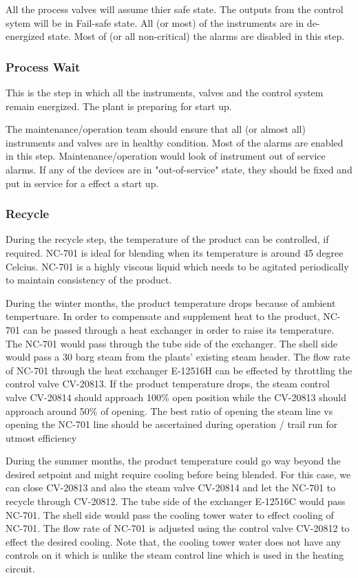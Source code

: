 \documentclass[a4paper,oneside]{article}
\begin{document}
All the process valves will assume thier safe state. The
outputs from the control sytem will be in Fail-safe state. All (or
most) of the instruments are in de-energized state. Most of (or all
non-critical) the alarms are disabled in this step.
\subsubsection{Process Wait}
\label{sec:org2c683be}
This is the step in which all the instruments, valves and the control
system remain energized. The plant is preparing for start up. 

The maintenance/operation team should ensure that all (or almost all)
instruments and valves are in healthy condition. Most of the alarms
are enabled in this step. Maintenance/operation would look of
instrument out of service alarms. If any of the devices are in
"out-of-service" state, they should be fixed and put in service for a
effect a start up.
\subsubsection{Recycle}
\label{sec:org1236355}
During the recycle step, the temperature of the product can be
controlled, if required. NC-701 is ideal for blending when its
temperature is around 45 degree Celcius. NC-701 is a highly viscous
liquid which needs to be agitated periodically to maintain consistency
of the product.

During the winter months, the product temperature drops because of
ambient tempertuare. In order to compensate and supplement heat to the
product, NC-701 can be passed through a heat exchanger in order to
raise its temperature. The NC-701 would pass through the tube side of
the exchanger. The shell side would pass a 30 barg steam from the
plants' existing steam header. The flow rate of NC-701 through the
heat exchanger E-12516H can be effected by throttling the control
valve CV-20813. If the product temperature drops, the steam control
valve CV-20814 should approach 100\% open position while the CV-20813
should approach around 50\% of opening. The best ratio of opening the
steam line vs opening the NC-701 line should be ascertained during
operation / trail run for utmost efficiency

During the summer months, the product temperature could go way beyond
the desired setpoint and might require cooling before being
blended. For this case, we can close CV-20813 and also the steam valve
CV-20814 and let the NC-701 to recycle through CV-20812. The tube side
of the exchanger E-12516C would pass NC-701. The shell side would pass
the cooling tower water to effect cooling of NC-701. The flow rate of
NC-701 is adjusted using the control valve CV-20812 to effect the
desired cooling. Note that, the cooling tower water does not have any
controls on it which is unlike the steam control line which is used in
the heating circuit.
\end{document}
